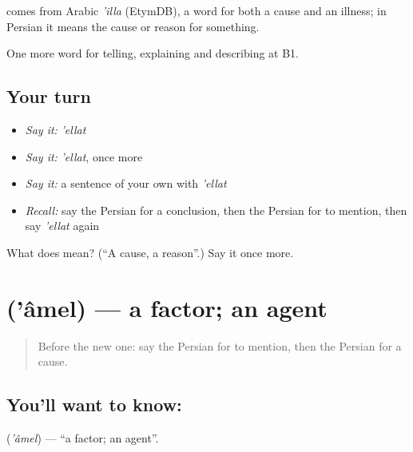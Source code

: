 \begin{cousinweb}
\textbf{} comes from Arabic \emph{'illa} (EtymDB), a word for both a cause and an illness; in Persian it means the cause or reason for something.
\end{cousinweb}

\begin{grammarlens}[title={What you've built}]
One more word for telling, explaining and describing at B1.
\end{grammarlens}

\subsection*{Your turn}
\begin{itemize}
\raggedright
  \item \emph{Say it:} \emph{'ellat}
  \item \emph{Say it:} \emph{'ellat}, once more
  \item \emph{Say it:} a sentence of your own with \emph{'ellat}
  \item \emph{Recall:} say the Persian for a conclusion, then the Persian for to mention, then say \emph{'ellat} again
\end{itemize}

\begin{tcolorbox}[breakable,colback=teal!4,colframe=teal!35!black,title={Before you move on}]
What does  mean? (\textquotedblleft{}A cause, a reason\textquotedblright{}.) Say it once more.
\end{tcolorbox}
\section[\texorpdfstring{\fa{عامل} ('âmel)}{عامل ('âmel)}]{ ('âmel) — a factor; an agent}

\label{lesson:FA-C369-amel}



\begin{quote}
Before the new one: say the Persian for to mention, then the Persian for a cause.
\end{quote}

\subsection*{You'll want to know: }
\textbf{} (\emph{'âmel}) — \textquotedblleft{}a factor; an agent\textquotedblright{}.

